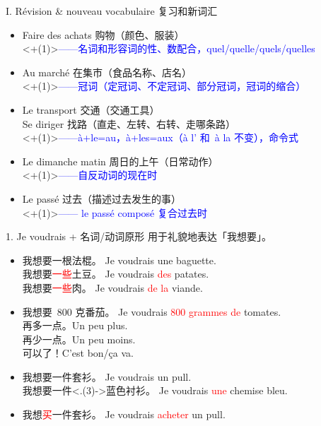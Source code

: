 \documentclass[french, aspectratio=169, 14pt, handout]{beamer}
\newcommand{\red}[1]{\textcolor{red}{#1}} %
\newcommand{\blue}[1]{\textcolor{blue}{#1}} %
\begin{document}
\begin{CJK*}{UTF8}{gkai}
\begin{frame}[c]{I. Révision \& nouveau vocabulaire 复习和新词汇}
\begin{itemize}
	\item Faire des achats 购物（颜色、服装） \\ \visible<+(1)>{\blue{——名词和形容词的性、数配合，quel/quelle/quels/quelles}}
	\item Au marché 在集市（食品名称、店名） \\ \visible<+(1)>{\blue{——冠词（定冠词、不定冠词、部分冠词，冠词的缩合）}}
	\item Le transport 交通（交通工具）\\ Se diriger 找路（直走、左转、右转、走哪条路） \\ \visible<+(1)>{\blue{——à+le=au，à+les=aux（à l' 和~à la 不变），命令式}}
	\item Le dimanche matin 周日的上午（日常动作） \\ \visible<+(1)>{\blue{——自反动词的现在时}}
	\item Le passé 过去（描述过去发生的事） \\ \visible<+(1)>{\blue{—— le passé composé 复合过去时}}
\end{itemize}
\end{frame}

\begin{frame}{1. Je voudrais + 名词/动词原形}
用于礼貌地表达「我想要」。
\begin{itemize}
    \item 我想要一根法棍。 Je voudrais une baguette. \pause \\
    我想要\red{一些}土豆。 \pause Je voudrais \pause \red{des} patates. \pause \\
    我想要\red{一些}肉。 \pause Je voudrais \pause \red{de la} viande.  \pause \\
    \item 我想要~800 克番茄。 \pause Je voudrais \pause \red{800 grammes} \pause \red{de} \pause tomates. \pause \\
    再多一点。\pause Un peu plus. \pause \\
    再少一点。\pause Un peu moins. \pause \\
    可以了！\pause C’est bon/ça va. \pause
    \item 我想要一件套衫。 \pause Je voudrais un pull.  \pause \\
    我想要一件\visible<.(3)->{蓝色}衬衫。 \pause Je voudrais \red{une} chemise \pause bleu\pause{\red{e}}.  \pause
	\item 我想\red{买}一件套衫。 \pause Je voudrais \pause \red{acheter} \pause un pull. 
\end{itemize}
\end{frame}


\end{CJK*}
\end{document}
